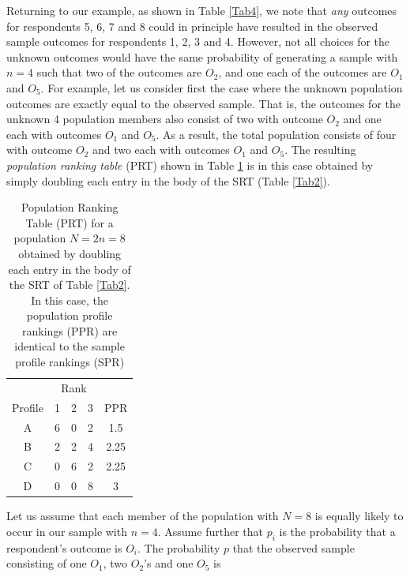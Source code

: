 \documentclass[a4paper, 12pt]{article}
\begin{document}
{\flushleft Returning to our example, as shown in Table \ref{Tab4}, } we note that \emph{any} outcomes for respondents 5, 6,  7 and 8 could in principle have resulted in the observed sample outcomes for respondents 1, 2, 3 and 4.  However, not all choices for the unknown outcomes would have the same probability of generating a sample with $n= 4$ such that  two of the outcomes are $O_2$, and one each of the outcomes are $O_1$ and $O_5$.  For example, let us consider first the case where the unknown population outcomes are exactly equal to the observed sample.  That is, the outcomes for the unknown 4 population members also consist of two with outcome $O_2$ and one each with outcomes $O_1$ and $O_5$. As a result, the total population consists of four with outcome $O_2$ and two each with outcomes $O_1$ and $O_5$. The resulting \emph{population ranking table} (PRT) shown in Table \ref{Tab5} is in this case obtained by simply doubling each entry in the body of the SRT (Table \ref{Tab2}).
\begin{table}[!htpb]
\centering
\scriptsize
\begin{tabular}{c|ccc|c}
&\multicolumn{3}{c}{Rank}&\\
Profile& 1 & 2 & 3&PPR\\\hline
A& 6&0&2&1.5\\
B& 2 &2&4 &2.25\\
C& 0 &6&2&2.25 \\
D& 0 &0&8&3 \\
\end{tabular}
\caption{{\small Population Ranking Table (PRT) for a population $N=2n=8$ obtained by doubling each entry in the body of the SRT of Table \ref{Tab2}. In this case, the population profile rankings (PPR) are identical to the sample profile rankings (SPR)}}
\label{Tab5}
\end{table}

 
Let us assume that each member of the population with $N=8$ is equally likely to occur in our sample with $n=4$. Assume further that $p_i$ is the probability that a respondent's outcome is $O_i$. The probability $p$ that the observed sample consisting of one $O_1$, two $O_2$'s and one $O_5$ is 
\end{document}

